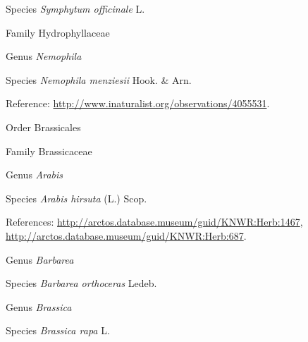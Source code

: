 \documentclass[9pt, article]{memoir}
\begin{document}
\begin{multicols}{2}
\vspace{6pt}\noindent\hspace{36pt}Species \textit{Symphytum officinale} L.


\vspace{6pt}\noindent\hspace{24pt}Family Hydrophyllaceae


\vspace{6pt}\noindent\hspace{30pt}Genus \textit{Nemophila}


\vspace{6pt}\noindent\hspace{36pt}Species \textit{Nemophila menziesii} Hook. \& Arn.


\vspace{6pt}Reference: 
\url{http://www.inaturalist.org/observations/4055531}.

\vspace{6pt}\noindent\hspace{18pt}Order Brassicales


\vspace{6pt}\noindent\hspace{24pt}Family Brassicaceae


\vspace{6pt}\noindent\hspace{30pt}Genus \textit{Arabis}


\vspace{6pt}\noindent\hspace{36pt}Species \textit{Arabis hirsuta} (L.) Scop.


\vspace{6pt}References: 
\url{http://arctos.database.museum/guid/KNWR:Herb:1467}, 
\url{http://arctos.database.museum/guid/KNWR:Herb:687}.

\vspace{6pt}\noindent\hspace{30pt}Genus \textit{Barbarea}


\vspace{6pt}\noindent\hspace{36pt}Species \textit{Barbarea orthoceras} Ledeb.


\vspace{6pt}\noindent\hspace{30pt}Genus \textit{Brassica}


\vspace{6pt}\noindent\hspace{36pt}Species \textit{Brassica rapa} L.



\end{multicols}
\end{document}
